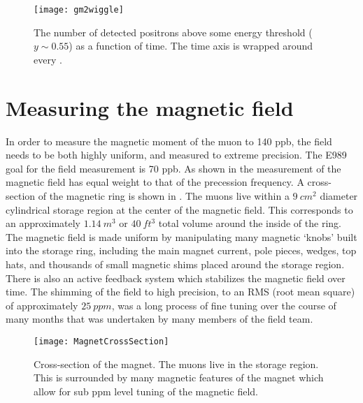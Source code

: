 \begin{figure}[]
    \centering
    \texttt{[image: gm2wiggle]}
    \caption[\gmtwo wiggle example]{The number of detected positrons above some energy threshold ($y \sim 0.55$) as a function of time. The time axis is wrapped around every .}
    \label{fig:gm2wiggle}
\end{figure}



\section{Measuring the magnetic field}
\label{sec:MagneticField}


In order to measure the magnetic moment of the muon to 140 ppb, the field needs to be both highly uniform, and measured to extreme precision. The E989 goal for the field measurement is 70 ppb. As shown in  the measurement of the magnetic field has equal weight to that of the precession frequency. A cross-section of the magnetic ring is shown in . The muons live within a $\SI{9}{cm^{2}}$ diameter cylindrical storage region at the center of the magnetic field. This corresponds to an approximately $\SI{1.14}{m^{3}}$ or $\SI{40}{ft^{3}}$ total volume around the inside of the ring. The magnetic field is made uniform by manipulating many magnetic `knobs' built into the \gmtwo storage ring, including the main magnet current, pole pieces, wedges, top hats, and thousands of small magnetic shims placed around the storage region. There is also an active feedback system which stabilizes the magnetic field over time. The shimming of the field to high precision, to an RMS (root mean square) of approximately $\SI{25}{ppm}$, was a long process of fine tuning over the course of many months that was undertaken by many members of the field team.

\begin{figure}[]
    \centering
    \texttt{[image: MagnetCrossSection]}
    \caption[Magnet cross section]{Cross-section of the \gmtwo magnet. The muons live in the storage region. This is surrounded by many magnetic features of the magnet which allow for sub ppm level tuning of the magnetic field.}
    \label{fig:MagnetCrossSection}
\end{figure}


